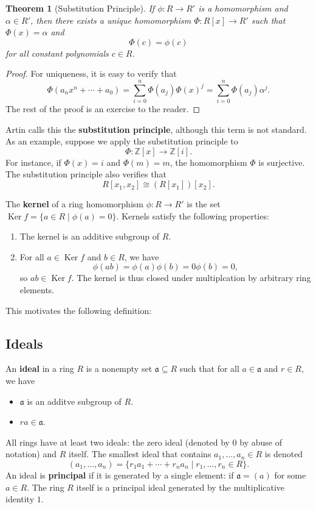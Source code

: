 \documentclass[11pt]{article}
\newtheorem{theorem}{Theorem}
\newcommand{\Ker}{\operatorname{Ker}}
\begin{document}
\begin{theorem}[Substitution Principle]
	If $\phi : R \to R'$ is a homomorphism and $\alpha \in R'$, then there exists a unique homomorphism $\Phi : R[x] \to R'$ such that $\Phi(x) = \alpha$ and
	\[
		\Phi (c) = \phi(c)
	\]
	for all constant polynomials $c \in R$.
\end{theorem}
\begin{adjustwidth}{0.5cm}{}
	\begin{proof}
		For uniqueness, it is easy to verify that
		\[
			\Phi(a_{n}x^{n} + \cdots + a_{0}) = \sum\limits_{i = 0}^{n} \Phi(a_{j}) \Phi(x)^{j} = \sum\limits_{i = 0}^{n} \Phi(a_{j}) \alpha^{j}.
		\]
		The rest of the proof is an exercise to the reader.
	\end{proof}
\end{adjustwidth}

Artin calls this the \textbf{substitution principle}, although this term is not standard. As an example, suppose we apply the substitution principle to 
\[
	\Phi : \mathbb{Z}[x] \to \mathbb{Z}[i].
\]
For instance, if $\Phi(x) = i$ and $\Phi(m) = m$, the homomorphism $\Phi$ is surjective. The substitution principle also verifies that
\[
	R[x_{1}, x_{2}] \cong \left( R[x_{1}] \right) [x_{2}].
\]

\newpage

The \textbf{kernel} of a ring homomorphism $\phi : R \to R'$ is the set $\Ker f = \{ a \in R \mid \phi(a) = 0 \}$. Kernels satisfy the following properties:
\begin{enumerate}
	\item The kernel is an additive subgroup of $R$.
	\item For all $a \in \Ker f$ and $b \in R$, we have
	\[
		\phi(ab) = \phi(a) \phi(b) = 0 \phi(b) = 0,
	\]
	so $ab \in \Ker f$. The kernel is thus closed under multiplcation by arbitrary ring elements.
\end{enumerate}

This motivates the following definition:


\subsection{Ideals}

An \textbf{ideal} in a ring $R$ is a nonempty set $\mathfrak{a} \subseteq R$ such that for all $a \in \mathfrak{a}$ and $r \in R$, we have
\begin{itemize}
	\item $\mathfrak{a}$ is an additve subgroup of $R$.
	\item $ra \in \mathfrak{a}$.
\end{itemize}
All rings have at least two ideals: the zero ideal (denoted by $0$ by abuse of notation) and $R$ itself. The smallest ideal that contains $a_{1}, \ldots, a_{n} \in R$ is denoted 
\[
	(a_{1}, \ldots, a_{n}) = \{ r_{1} a_{1} + \cdots + r_{n} a_{n} \mid r_{1}, \ldots, r_{n} \in R \}.
\]
An ideal is \textbf{principal} if it is generated by a single element: if $\mathfrak{a} = (a)$ for some $a \in R$. The ring $R$ itself is a principal ideal generated by the multiplicative identity $1$.
\end{document}
